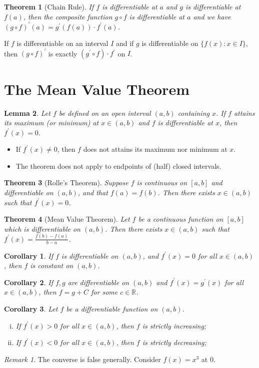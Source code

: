 \documentclass[12pt, lettersize]{book}
\theoremstyle{plain}
\newtheorem{thm}{Theorem}[section]
\newtheorem{lem}[thm]{Lemma}
\newtheorem{cor}{Corollary}[thm]
\theoremstyle{definition}
\theoremstyle{remark}
\newtheorem*{rem}{Remark}
\newcommand{\R}{\mathbb{R}}
\begin{document}
		\begin{thm}[Chain Rule]\label{def:28.4}
			If $f$ is differentiable at $a$ and $g$ is differentiable at $f(a)$, then the composite function $g\circ f$ is differentiable at $a$ and we have $(g\circ f)^\prime(a)=g^\prime(f(a))\cdot f^\prime(a)$.
		\end{thm}
		If $f$ is differentiable on an interval $I$ and if $g$ is differentiable on $\{f(x): x\in I\}$, then $(g\circ f)^\prime$ is exactly $(g^\prime\circ f)\cdot f^\prime$ on $I$.
		\newpage
		
		\section{The Mean Value Theorem}
		\begin{lem}
		Let $f$ be defined on an open interval $(a,b)$ containing $x$. If $f$ attains its maximum (or minimum) at $x\in(a,b)$ and $f$ is differentiable at $x$, then $f^\prime(x)=0$.
		\end{lem}
		\begin{itemize}
			\item If $f^\prime(x)\neq0$, then $f$ does not attains its maximum nor minimum at $x$.
			\item The theorem does not apply to endpoints of (half) closed intervals.
		\end{itemize}
		
		\begin{thm}[Rolle's Theorem]\label{thm:29.2, Rolle}
			Suppose $f$ is continuous on $[a,b]$ and differentiable on $(a,b)$, and that $f(a)=f(b)$. Then there exists $x\in(a,b)$ such that $f^\prime(x)=0$.
		\end{thm}
		
		\begin{thm}[Mean Value Theorem]\label{thm:29.3, MVT}
			Let $f$ be a continuous function on $[a,b]$ which is differentiable on $(a,b)$. Then there exists $x\in(a,b)$ such that $f^\prime(x)=\frac{f(b)-f(a)}{b-a}$.
		\end{thm}

		\begin{cor}
			If $f$ is differentiable on $(a,b)$, and $f^\prime(x)=0$ for all $x\in(a,b)$, then $f$ is constant on $(a,b)$.
		\end{cor}

		\begin{cor}
			If $f,g$ are differentiable on $(a,b)$ and $f^\prime(x)=g^\prime(x)$ for all $x\in(a,b)$, then $f=g+C$ for some $c\in\R$.
		\end{cor}
		\newpage
		\begin{cor}
			Let $f$ be a differentiable function on $(a,b)$.
			\begin{enumerate}[(i)]
				\item If $f^\prime(x)>0$ for all $x\in(a,b)$, then $f$ is strictly increasing;
				\item If $f^\prime(x)<0$ for all $x\in(a,b)$, then $f$ is strictly decreasing; 
			\end{enumerate}
		\end{cor}
		\begin{rem}
			The converse is false generally. Consider $f(x)=x^3$ at $0$.
		\end{rem}
		
\end{document}
